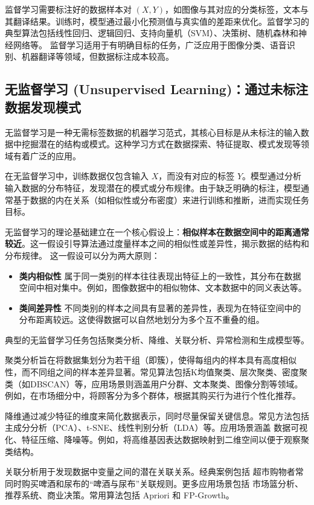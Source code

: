 监督学习需要标注好的数据样本对 $(X, Y)$，如图像与其对应的分类标签，文本与其翻译结果。训练时，模型通过最小化预测值与真实值的差距来优化。监督学习的典型算法包括线性回归、逻辑回归、支持向量机（SVM）、决策树、随机森林和神经网络等。
监督学习适用于有明确目标的任务，广泛应用于图像分类、语音识别、机器翻译等领域，但数据标注成本较高。
  
\subsection{ 无监督学习 (Unsupervised Learning)：通过未标注数据发现模式}

无监督学习是一种无需标签数据的机器学习范式，其核心目标是从未标注的输入数据中挖掘潜在的结构或模式。这种学习方式在数据探索、特征提取、模式发现等领域有着广泛的应用。

在无监督学习中，训练数据仅包含输入 $X$，而没有对应的标签 $Y$。模型通过分析输入数据的分布特征，发现潜在的模式或分布规律。由于缺乏明确的标注，模型通常基于数据的内在关系（如相似性或分布密度）来进行训练和推断，进而实现任务目标。

无监督学习的理论基础建立在一个核心假设上：{\bf 相似样本在数据空间中的距离通常较近}。这一假设引导算法通过度量样本之间的相似性或差异性，揭示数据的结构和分布规律。
这一假设可以分为两大原则：
\begin{itemize}
\item {\bf 类内相似性}  属于同一类别的样本往往表现出特征上的一致性，其分布在数据空间中相对集中。例如，图像数据中的相似物体、文本数据中的同义表达等。
\item {\bf 类间差异性}  不同类别的样本之间具有显著的差异性，表现为在特征空间中的分布距离较远。这使得数据可以自然地划分为多个互不重叠的组。
\end{itemize}

典型的无监督学习任务包括聚类分析、降维、关联分析、异常检测和生成模型等。

聚类分析旨在将数据集划分为若干组（即簇），使得每组内的样本具有高度相似性，而不同组之间的样本差异显著。常见算法包括K均值聚类、层次聚类、密度聚类（如DBSCAN）等，应用场景则涵盖用户分群、文本聚类、图像分割等领域。例如，在市场细分中，将顾客分为多个群体，根据其购买行为进行个性化推荐。

降维通过减少特征的维度来简化数据表示，同时尽量保留关键信息。常见方法包括主成分分析（PCA）、t-SNE、线性判别分析（LDA）等。应用场景涵盖 数据可视化、特征压缩、降噪等。例如，将高维基因表达数据映射到二维空间以便于观察聚类结构。

关联分析用于发现数据中变量之间的潜在关联关系。经典案例包括 超市购物者常同时购买啤酒和尿布的“啤酒与尿布”关联规则。更多应用场景包括 市场篮分析、推荐系统、商业决策。常用算法包括 Apriori 和 FP-Growth。

